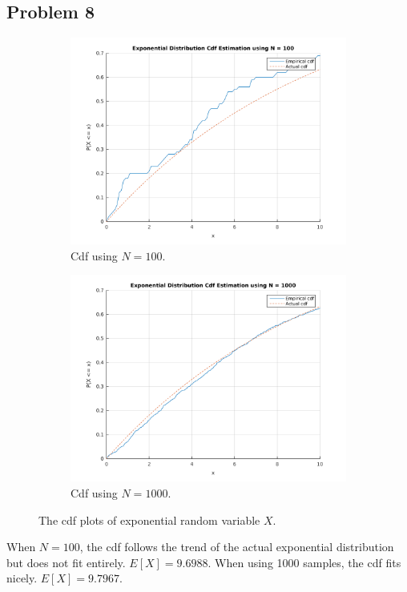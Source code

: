 \documentclass{article}
\begin{document}
	\subsection*{Problem 8}
		\begin{figure}[!hbt]
			\centering
			\begin{subfigure}[!hbt]{0.45\linewidth}
				\centering
				\includegraphics[width=1\linewidth]{hw2_8_exp_n100.png}
				\caption{Cdf using $N = 100$.}
			\end{subfigure}
			\begin{subfigure}[!hbt]{0.45\linewidth}
				\centering
				\includegraphics[width=1\linewidth]{hw2_8_exp_n1000.png}
				\caption{Cdf using $N = 1000$.}
			\end{subfigure}
			\caption{The cdf plots of exponential random variable $X$.}
		\end{figure}
		When $N = 100$, the cdf follows the trend of the actual exponential
		distribution but does not fit entirely. $E[X] = 9.6988$. When using 1000
		samples, the cdf fits nicely. $E[X] = 9.7967$.
\end{document}
